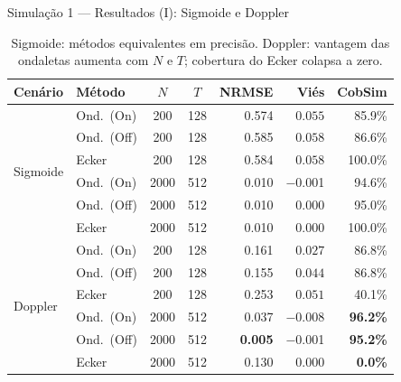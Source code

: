 \documentclass{beamer}
\begin{document}
\begin{frame}{Simulação 1 — Resultados (I): Sigmoide e Doppler}
\begin{table}
\centering
{\scriptsize
\begin{tabular}{llccrrr}
\toprule
Cenário & Método & \(N\) & \(T\) & NRMSE & Viés & CobSim \\
\midrule
\multirow{6}{*}{Sigmoide}
 & Ond.\ (On)  & 200  & 128 & 0.574 & $0.055$ & 85.9\% \\
 & Ond.\ (Off) & 200  & 128 & 0.585 & $0.058$ & 86.6\% \\
 & Ecker       & 200  & 128 & 0.584 & $0.058$ & 100.0\% \\
\cmidrule{2-7}
 & Ond.\ (On)  & 2000 & 512 & 0.010 & $-$0.001 & 94.6\% \\
 & Ond.\ (Off) & 2000 & 512 & 0.010 &    0.000 & 95.0\% \\
 & Ecker       & 2000 & 512 & 0.010 &    0.000 & 100.0\% \\
\midrule
\multirow{6}{*}{Doppler}
 & Ond.\ (On)  & 200  & 128 & 0.161 & $0.027$ & 86.8\% \\
 & Ond.\ (Off) & 200  & 128 & 0.155 & $0.044$ & 86.8\% \\
 & Ecker       & 200  & 128 & 0.253 & $0.051$ & 40.1\% \\
\cmidrule{2-7}
 & Ond.\ (On)  & 2000 & 512 & 0.037 & $-$0.008 & \textbf{96.2\%} \\
 & Ond.\ (Off) & 2000 & 512 & \textbf{0.005} & $-$0.001 & \textbf{95.2\%} \\
 & Ecker       & 2000 & 512 & 0.130 &    0.000 & \textbf{0.0\%} \\
\bottomrule
\end{tabular}
}
\caption{\scriptsize Sigmoide: métodos equivalentes em precisão. Doppler: vantagem das ondaletas aumenta com \(N\) e \(T\); cobertura do Ecker colapsa a zero.}
\end{table}
\end{frame}
\end{document}
